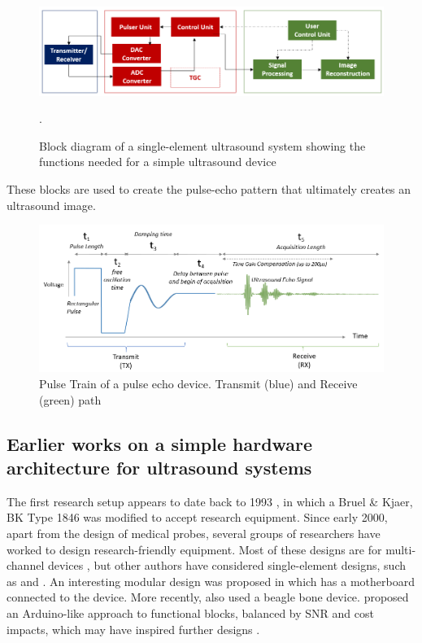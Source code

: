 \documentclass{article}
\begin{document}
\begin{figure}[H]
 \includegraphics[width=\linewidth]{images/Blockdiagramme.PNG}
 \caption{Block diagram of a single-element ultrasound system showing the functions needed for a simple ultrasound device}.
 \label{fig:BlockDiagramme}
\end{figure}
These blocks are used to create the pulse-echo pattern that ultimately creates an ultrasound image.

\begin{figure}[H]
 \includegraphics[width=\linewidth]{images/PulseTrain.PNG}
 \caption{Pulse Train of a pulse echo device. Transmit (blue) and Receive (green) path}
 \label{fig:PulseTrain}
\end{figure}




\subsection{Earlier works on a simple hardware architecture for ultrasound systems}

The first research setup appears to date back to 1993 \cite{jensen_deconvolution_1993}, in which a Bruel \& Kjaer, BK Type 1846 was modified to accept research equipment.
Since early 2000, apart from the design of medical probes, several groups of researchers have worked to design research-friendly equipment. Most of these designs are for multi-channel devices \cite{boni_ula-op_2016, boni_reconfigurable_2012, boni_ultrasound_2018, qiu_flexible_2012, levesque_architecture_2011}, but other authors have considered single-element designs, such as \cite{carotenuto_fast_2005} and \cite{richard_low-cost_2008}. An interesting modular design was proposed in \cite{wall_high-speed_2010} which has a motherboard connected to the device. More recently, \cite{taylor_development_2017} also used a beagle bone device. \cite{jonveaux_arduino-like_2017} proposed an Arduino-like approach to functional blocks, balanced by SNR and cost impacts, which may have inspired further designs \cite{golabek_construction_2019}.
\end{document}
